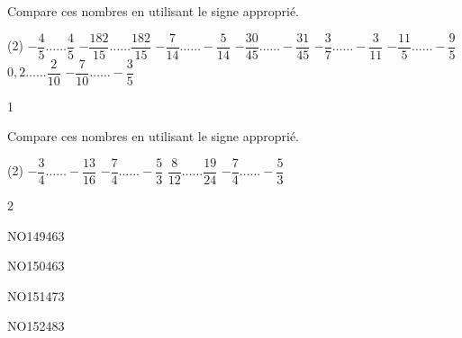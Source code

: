 \documentclass[a4paper,11pt]{report}
\begin{document}
\begin{exop}{
Compare ces nombres en utilisant le signe approprié. 
\begin{tasks}(2)
\task $-\dfrac{4}{5}\ldots \ldots \dfrac{4}{5} $
\task $-\dfrac{182}{15}\ldots \ldots \dfrac{182}{15} $
     \task $-\dfrac{7}{14}\ldots \ldots -\dfrac{5}{14} $
	\task $-\dfrac{30}{45}\ldots\ldots 
 -\dfrac{31}{45}$
	\task $-\dfrac{3}{7}\ldots \ldots -\dfrac{3}{11}$
   \task $-\dfrac{11}{5}\ldots \ldots -\dfrac{9}{5} $
 \task $0,2 \ldots \ldots \dfrac{2}{10} $
	\task $-\dfrac{7}{10}\ldots \ldots -\dfrac{3}{5} $
\end{tasks}
}{1}
\end{exop}

\begin{exop}{
Compare ces nombres en utilisant le signe approprié. 
\begin{tasks}(2)
	\task $-\dfrac{3}{4}\ldots \ldots -\dfrac{13}{16} $
    \task $-\dfrac{7}{4}\ldots \ldots -\dfrac{5}{3} $
	\task $\dfrac{8}{12}\ldots \ldots \dfrac{19}{24} $
	\task $-\dfrac{7}{4}\ldots \ldots -\dfrac{5}{3} $

\end{tasks}
}{2}
\end{exop}

\begin{exof}{NO149}{46}{3}
\end{exof}
\begin{exof}{NO150}{46}{3}
\end{exof}
\begin{exof}{NO151}{47}{3}
\end{exof}
\begin{exof}{NO152}{48}{3}
\end{exof}
\end{document}
